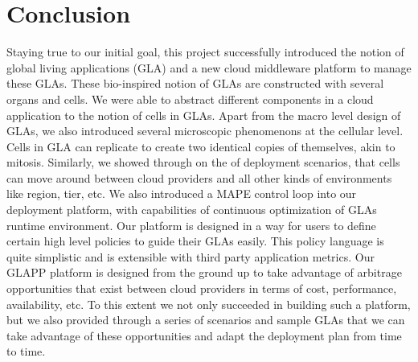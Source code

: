 \documentclass{seal_thesis}
\begin{document}
\chapter{Conclusion}\label{ch:conclusion}


Staying true to our initial goal, this project successfully introduced the notion of global living applications (GLA) and a new cloud middleware platform to manage these GLAs.
These bio-inspired notion of GLAs are constructed with several organs and cells. 
We were able to abstract different components in a cloud application to the notion of cells in GLAs.
Apart from the macro level design of GLAs, we also introduced several microscopic phenomenons at the cellular level. 
Cells in GLA can replicate to create two identical copies of themselves, akin to mitosis.
Similarly, we showed through on the of deployment scenarios, that cells can move around between cloud providers and all other kinds of environments like region, tier, etc.
We also introduced a MAPE control loop into our deployment platform, with capabilities of continuous optimization of GLAs runtime environment.
Our platform is designed in a way for users to define certain high level policies to guide their GLAs easily.
This policy language is quite simplistic and is extensible with third party application metrics.
Our GLAPP platform is designed from the ground up to take advantage of arbitrage opportunities that exist between cloud providers in terms of cost, performance, availability, etc.
To this extent we not only succeeded in building such a platform, but we also provided through a series of scenarios and sample GLAs that we can take advantage of these opportunities and adapt the deployment plan from time to time.
\end{document}
